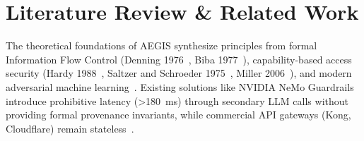 \section{Literature Review \& Related Work}
The theoretical foundations of AEGIS synthesize principles from formal Information Flow Control (Denning 1976~\cite{denning1976lattice}, Biba 1977~\cite{biba1977integrity}), capability-based access security (Hardy 1988~\cite{hardy1988confused}, Saltzer and Schroeder 1975~\cite{saltzer1975protection}, Miller 2006~\cite{miller2006robust}), and modern adversarial machine learning~\cite{greshake2023not,liu2024prompt,xie2024defending}. Existing solutions like NVIDIA NeMo Guardrails~\cite{rebedea2023nemo} introduce prohibitive latency (>180~ms) through secondary LLM calls without providing formal provenance invariants, while commercial API gateways (Kong, Cloudflare) remain stateless~\cite{beloglazov2013managing,mell2011nist,sandhu1996role}.
